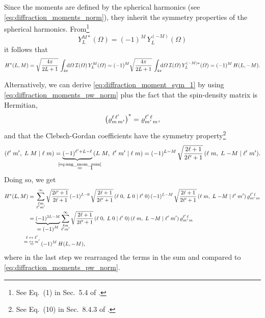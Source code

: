 Since the moments are defined by the spherical harmonics (see
\cref{eq:diffraction_moments_norm}), they inherit the symmetry properties
of the spherical harmonics.  From\footnote{See Eq.~(1) in Sec.~5.4 of
.}
\begin{equation}
  \label{eq:spherical_harm_sym}
  Y_L^{M *}(\Omega)
  = (-1)^M\, Y_L^{(-M)}(\Omega)
\end{equation}
it follows that
\begin{equation}
  \label{eq:diffraction_moment_sym_1}
  H^*(L, M)
  = \sqrt{\frac{4 \pi}{2 L + 1}}\, \int_{4 \pi}\!\!\! \dif{\Omega}\, \intensity(\Omega)\, Y_L^M(\Omega)
  = (-1)^M \sqrt{\frac{4 \pi}{2 L + 1}}\, \int_{4 \pi}\!\!\! \dif{\Omega}\, \intensity(\Omega)\, Y_L^{(-M) *}(\Omega)
  = (-1)^M\, H(L, -M).
\end{equation}

Alternatively, we can derive \cref{eq:diffraction_moment_sym_1} by
using \cref{eq:diffraction_moments_pw_norm} plus the fact that the
spin-density matrix is Hermitian,
\ie
\begin{equation}
  \rBrk[1]{\varrho^{\ell\, \ell'}_{m\, m'}}^*
  = \varrho^{\ell'\, \ell}_{m'\, m},
\end{equation}
and that the Clebsch-Gordan coefficients have the symmetry
property\footnote{See Eq.~(10) in Sec.~8.4.3 of
.}
\begin{equation}
  \label{eq:clebsch_sym}
  \clebsch{\ell'}{m'}{L}{M}{\ell}{m}
  = \rdUnderbrace{(-1)^{\ell' + L - \ell}}{\equalUsing{$\mathclap{\text{\cref{eq:ang_mom_sum}}}$}\quad 1}\,
  \clebsch{L}{M}{\ell'}{m'}{\ell}{m}
  = (-1)^{L - M}\, \sqrt{\frac{2 \ell + 1}{2 \ell' + 1}}\, \clebsch{\ell}{m}{L}{-M}{\ell'}{m'}.
\end{equation}
Doing so, we get
\begin{align}
  H^*(L, M)
  ={}& \sum_{\substack{\ell m \\ \ell' m'}}^\infty
    \sqrt{\frac{2 \ell' + 1}{2 \ell + 1}}\,
    (-1)^{L - 0}\, \sqrt{\frac{2 \ell + 1}{2 \ell' + 1}}\, \clebsch{\ell}{0}{L}{0}{\ell'}{0}\,
    (-1)^{L - M}\, \sqrt{\frac{2 \ell + 1}{2 \ell' + 1}}\, \clebsch{\ell}{m}{L}{-M}{\ell'}{m'}\,
    \varrho^{\ell'\, \ell}_{m'\, m} \nonumber
  \\
  ={}& \dUnderbrace{(-1)^{2 L - M}}{= (-1)^M}
  \sum_{\substack{\ell m \\ \ell' m'}}^\infty
  \sqrt{\frac{2 \ell + 1}{2 \ell' + 1}}\,
  \clebsch{\ell}{0}{L}{0}{\ell'}{0}\, \clebsch{\ell}{m}{L}{-M}{\ell'}{m'}\,
  \varrho^{\ell'\, \ell}_{m'\, m}
  \\
  \equalUsing{$\mathclap{\substack{\displaystyle{\ell \leftrightarrow \ell'} \\ \displaystyle{m \leftrightarrow m'}}}$}{}& \quad
  (-1)^M\, H(L, -M),
\end{align}
where in the last step we rearranged the terms in the sum and compared
to \cref{eq:diffraction_moments_pw_norm}.

